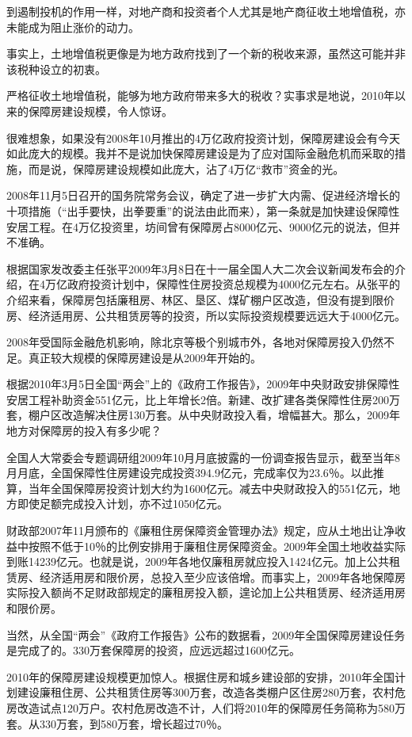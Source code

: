 到遏制投机的作用一样，对地产商和投资者个人尤其是地产商征收土地增值税，亦未能成为阻止涨价的动力。

事实上，土地增值税更像是为地方政府找到了一个新的税收来源，虽然这可能并非该税种设立的初衷。

严格征收土地增值税，能够为地方政府带来多大的税收？实事求是地说，2010年以来的保障房建设规模，令人惊讶。

很难想象，如果没有2008年10月推出的4万亿政府投资计划，保障房建设会有今天如此庞大的规模。我并不是说加快保障房建设是为了应对国际金融危机而采取的措施，而是说，保障房建设规模如此庞大，沾了4万亿“救市”资金的光。

2008年11月5日召开的国务院常务会议，确定了进一步扩大内需、促进经济增长的十项措施（“出手要快，出拳要重”的说法由此而来），第一条就是加快建设保障性安居工程。在4万亿投资里，坊间曾有保障房占8000亿元、9000亿元的说法，但并不准确。

根据国家发改委主任张平2009年3月8日在十一届全国人大二次会议新闻发布会的介绍，在4万亿政府投资计划中，保障性住房投资总规模为4000亿元左右。从张平的介绍来看，保障房包括廉租房、林区、垦区、煤矿棚户区改造，但没有提到限价房、经济适用房、公共租赁房等的投资，所以实际投资规模要远远大于4000亿元。

2008年受国际金融危机影响，除北京等极个别城市外，各地对保障房投入仍然不足。真正较大规模的保障房建设是从2009年开始的。

根据2010年3月5日全国“两会”上的《政府工作报告》，2009年中央财政安排保障性安居工程补助资金551亿元，比上年增长2倍。新建、改扩建各类保障性住房200万套，棚户区改造解决住房130万套。从中央财政投入看，增幅甚大。那么，2009年地方对保障房的投入有多少呢？

全国人大常委会专题调研组2009年10月月底披露的一份调查报告显示，截至当年8月月底，全国保障性住房建设完成投资394.9亿元，完成率仅为23.6％。以此推算，当年全国保障房投资计划大约为1600亿元。减去中央财政投入的551亿元，地方即使足额完成投入计划，亦不过1050亿元。

财政部2007年11月颁布的《廉租住房保障资金管理办法》规定，应从土地出让净收益中按照不低于10％的比例安排用于廉租住房保障资金。2009年全国土地收益实际到账14239亿元。也就是说，2009年各地仅廉租房就应投入1424亿元。加上公共租赁房、经济适用房和限价房，总投入至少应该倍增。而事实上，2009年各地保障房实际投入额尚不足财政部规定的廉租房投入额，遑论加上公共租赁房、经济适用房和限价房。

当然，从全国“两会”《政府工作报告》公布的数据看，2009年全国保障房建设任务是完成了的。330万套保障房的投资，应远远超过1600亿元。

2010年的保障房建设规模更加惊人。根据住房和城乡建设部的安排，2010年全国计划建设廉租住房、公共租赁住房等300万套，改造各类棚户区住房280万套，农村危房改造试点120万户。农村危房改造不计，人们将2010年的保障房任务简称为580万套。从330万套，到580万套，增长超过70％。

